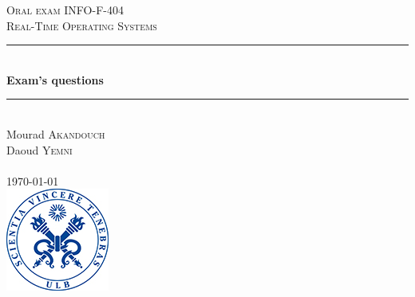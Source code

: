 \begin{titlepage}

\newcommand{\HRule}{\rule{\linewidth}{0.5mm}} %

\center %
 

\textsc{\Large Oral exam INFO-F-404}\\[0.5cm] %
\textsc{\large Real-Time Operating Systems}\\[0.5cm] %


\HRule \\[0.4cm]
{ \huge \bfseries Exam's questions}\\[0.4cm] %
\HRule \\[1.5cm]
 
Mourad \textsc{Akandouch}\\[0cm] %
Daoud  \textsc{Yemni}\\[0cm] %
       \textsc{         }\\[2cm] %

{\large \today}\\[3cm] %


\includegraphics{logo.jpg}\\[1cm] %
 

\end{titlepage}
